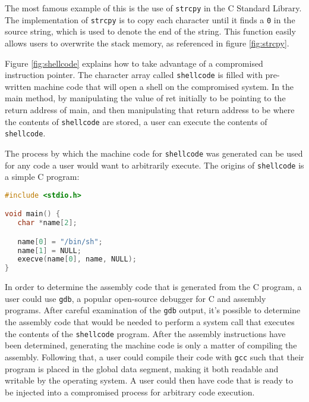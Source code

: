 The most famous example of this is the use of \texttt{strcpy} in the C Standard Library. The implementation of \texttt{strcpy} is to copy each character until it finds a \texttt{0} in the source string, which is used to denote the end of the string. This function easily allows users to overwrite the stack memory, as referenced in figure \ref{fig:strcpy}. \cite{buffer_overflow_attack_2004}

Figure \ref{fig:shellcode} explains how to take advantage of a compromised instruction pointer. The character array called \texttt{shellcode} is filled with pre-written machine code that will open a shell on the compromised system. In the main method, by manipulating the value of ret initially to be pointing to the return address of main, and then manipulating that return address to be where the contents of \texttt{shellcode} are stored, a user can execute the contents of \texttt{shellcode}.

The process by which the machine code for \texttt{shellcode} was generated can be used for any code a user would want to arbitrarily execute. The origins of \texttt{shellcode} is a simple C program:

\begin{lstlisting}[language=C]
#include <stdio.h>

void main() {
   char *name[2];

   name[0] = "/bin/sh";
   name[1] = NULL;
   execve(name[0], name, NULL);
}
\end{lstlisting}

In order to determine the assembly code that is generated from the C program, a user could use \texttt{gdb}, a popular open-source debugger for C and assembly programs. After careful examination of the \texttt{gdb} output, it's possible to determine the assembly code that would be needed to perform a system call that executes the contents of the \texttt{shellcode} program. After the assembly instructions have been determined, generating the machine code is only a matter of compiling the assembly. Following that, a user could compile their code with \texttt{gcc} such that their program is placed in the global data segment, making it both readable and writable by the operating system. A user could then have code that is ready to be injected into a compromised process for arbitrary code execution.

\newpage
\vfill

